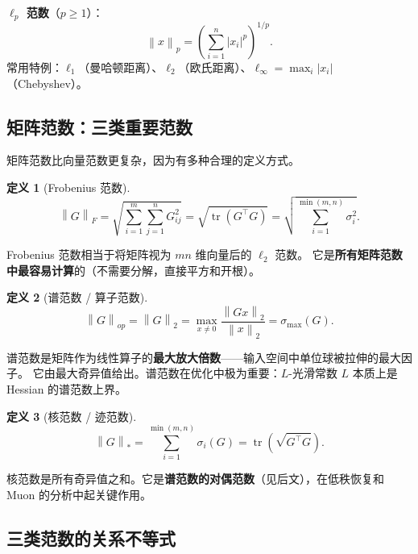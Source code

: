 \documentclass[12pt,a4paper]{ctexart}
\theoremstyle{definition}
\newtheorem{definition}{定义}[section]
\theoremstyle{plain}
\newcommand{\tr}{\operatorname{tr}}
\newcommand{\norm}[1]{\left\lVert #1 \right\rVert}
\begin{document}
\textbf{$\ell_p$ 范数}（$p\ge1$）：
\[
  \norm{x}_p = \left(\sum_{i=1}^n |x_i|^p\right)^{1/p}.
\]
常用特例：$\ell_1$（曼哈顿距离）、$\ell_2$（欧氏距离）、$\ell_\infty=\max_i|x_i|$（Chebyshev）。

\subsection{矩阵范数：三类重要范数}

矩阵范数比向量范数更复杂，因为有多种合理的定义方式。

\begin{definition}[Frobenius 范数]
  \begin{equation}\label{eq:frob}
    \norm{G}_F = \sqrt{\sum_{i=1}^m\sum_{j=1}^n G_{ij}^2}
    = \sqrt{\tr(G^\top G)}
    = \sqrt{\sum_{i=1}^{\min(m,n)}\sigma_i^2}.
  \end{equation}
\end{definition}

Frobenius 范数相当于将矩阵视为 $mn$ 维向量后的 $\ell_2$ 范数。
它是\textbf{所有矩阵范数中最容易计算}的（不需要分解，直接平方和开根）。

\vspace{0.3cm}

\begin{definition}[谱范数 / 算子范数]
  \begin{equation}\label{eq:spectral-norm}
    \norm{G}_{op} = \norm{G}_2 = \max_{x\neq0}\frac{\norm{Gx}_2}{\norm{x}_2}
    = \sigma_{\max}(G).
  \end{equation}
\end{definition}

谱范数是矩阵作为线性算子的\textbf{最大放大倍数}——输入空间中单位球被拉伸的最大因子。
它由最大奇异值给出。谱范数在优化中极为重要：$L$-光滑常数 $L$ 本质上是 Hessian 的谱范数上界。

\vspace{0.3cm}

\begin{definition}[核范数 / 迹范数]
  \begin{equation}\label{eq:nuclear}
    \norm{G}_* = \sum_{i=1}^{\min(m,n)} \sigma_i(G) = \tr\!\left(\sqrt{G^\top G}\right).
  \end{equation}
\end{definition}

核范数是所有奇异值之和。它是\textbf{谱范数的对偶范数}（见后文），在低秩恢复和 Muon 的分析中起关键作用。

\subsection{三类范数的关系不等式}
\end{document}
